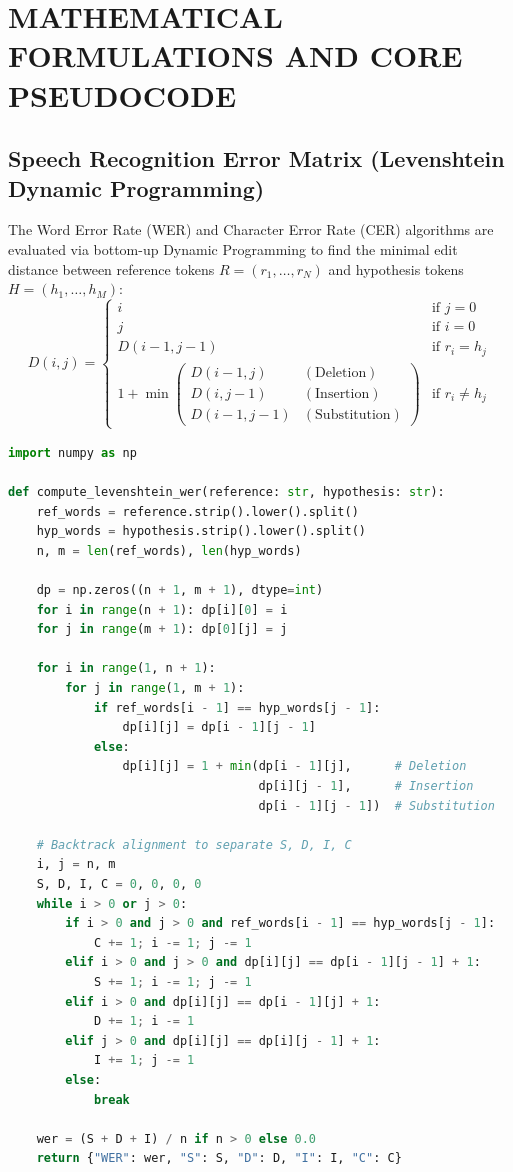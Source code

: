 \documentclass[12pt,oneside,letterpaper]{report}
\numberwithin{equation}{chapter} %
\begin{document}
\chapter{MATHEMATICAL FORMULATIONS AND CORE PSEUDOCODE}

\section{Speech Recognition Error Matrix (Levenshtein Dynamic Programming)}
The Word Error Rate (WER) and Character Error Rate (CER) algorithms are evaluated via bottom-up Dynamic Programming to find the minimal edit distance between reference tokens $R = (r_1, \dots, r_N)$ and hypothesis tokens $H = (h_1, \dots, h_M)$:
\begin{equation}
D(i, j) = \begin{cases} 
i & \text{if } j = 0 \\
j & \text{if } i = 0 \\
D(i-1, j-1) & \text{if } r_i = h_j \\
1 + \min\begin{pmatrix} D(i-1, j) & (\text{Deletion}) \\ D(i, j-1) & (\text{Insertion}) \\ D(i-1, j-1) & (\text{Substitution}) \end{pmatrix} & \text{if } r_i \ne h_j 
\end{cases}
\label{eq:dp_levenshtein}
\end{equation}

\begin{lstlisting}[language=Python]
import numpy as np

def compute_levenshtein_wer(reference: str, hypothesis: str):
    ref_words = reference.strip().lower().split()
    hyp_words = hypothesis.strip().lower().split()
    n, m = len(ref_words), len(hyp_words)
    
    dp = np.zeros((n + 1, m + 1), dtype=int)
    for i in range(n + 1): dp[i][0] = i
    for j in range(m + 1): dp[0][j] = j
        
    for i in range(1, n + 1):
        for j in range(1, m + 1):
            if ref_words[i - 1] == hyp_words[j - 1]:
                dp[i][j] = dp[i - 1][j - 1]
            else:
                dp[i][j] = 1 + min(dp[i - 1][j],      # Deletion
                                   dp[i][j - 1],      # Insertion
                                   dp[i - 1][j - 1])  # Substitution
                
    # Backtrack alignment to separate S, D, I, C
    i, j = n, m
    S, D, I, C = 0, 0, 0, 0
    while i > 0 or j > 0:
        if i > 0 and j > 0 and ref_words[i - 1] == hyp_words[j - 1]:
            C += 1; i -= 1; j -= 1
        elif i > 0 and j > 0 and dp[i][j] == dp[i - 1][j - 1] + 1:
            S += 1; i -= 1; j -= 1
        elif i > 0 and dp[i][j] == dp[i - 1][j] + 1:
            D += 1; i -= 1
        elif j > 0 and dp[i][j] == dp[i][j - 1] + 1:
            I += 1; j -= 1
        else:
            break
            
    wer = (S + D + I) / n if n > 0 else 0.0
    return {"WER": wer, "S": S, "D": D, "I": I, "C": C}
\end{lstlisting}
\end{document}
